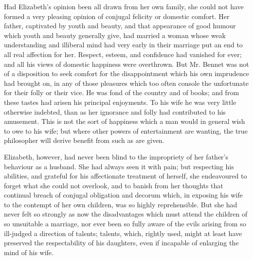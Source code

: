 Had Elizabeth's opinion been all drawn from her own family, she could not have formed a very pleasing opinion of conjugal felicity or domestic comfort. Her father, captivated by youth and beauty, and that appearance of good humour which youth and beauty generally give, had married a woman whose weak understanding and illiberal mind had very early in their marriage put an end to all real affection for her. Respect, esteem, and confidence had vanished for ever; and all his views of domestic happiness were overthrown. But Mr. Bennet was not of a disposition to seek comfort for the disappointment which his own imprudence had brought on, in any of those pleasures which too often console the unfortunate for their folly or their vice. He was fond of the country and of books; and from these tastes had arisen his principal enjoyments. To his wife he was very little otherwise indebted, than as her ignorance and folly had contributed to his amusement. This is not the sort of happiness which a man would in general wish to owe to his wife; but where other powers of entertainment are wanting, the true philosopher will derive benefit from such as are given.

Elizabeth, however, had never been blind to the impropriety of her father's behaviour as a husband. She had always seen it with pain; but respecting his abilities, and grateful for his affectionate treatment of herself, she endeavoured to forget what she could not overlook, and to banish from her thoughts that continual breach of conjugal obligation and decorum which, in exposing his wife to the contempt of her own children, was so highly reprehensible. But she had never felt so strongly as now the disadvantages which must attend the children of so unsuitable a marriage, nor ever been so fully aware of the evils arising from so ill-judged a direction of talents; talents, which, rightly used, might at least have preserved the respectability of his daughters, even if incapable of enlarging the mind of his wife.


